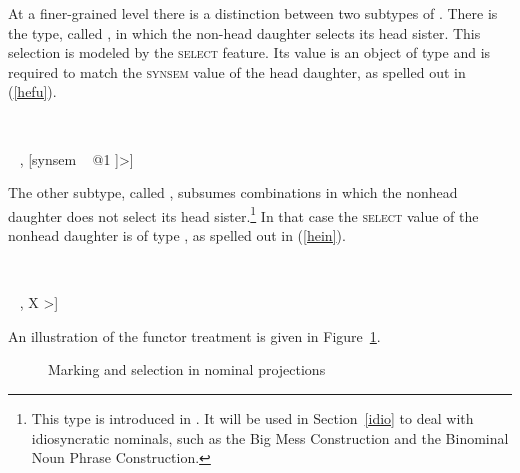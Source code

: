 \documentclass[output=paper
                ,modfonts
                ,nonflat
	        ,collection
	        ,collectionchapter
	        ,collectiontoclongg
 	        ,biblatex
                ,babelshorthands
                ,newtxmath
                ,draftmode
                ,colorlinks, citecolor=brown
]{./langsci/langscibook}
\begin{document}
\noindent
At a finer-grained level there is a distinction between two subtypes of 
. There is the type, called ,  
in which the non-head daughter selects its head sister. This selection is modeled 
by the \textsc{select} feature. Its value is an object of type  and is 
required to match the \textsc{synsem} value of the head daughter, as spelled out 
in (\ref{hefu}).  

\begin{exe}
\ex\label{hefu} 
 ~ \impl ~ 
\begin{avm}
[dtrs ~ <[synsem|loc|category|head|select ~ @1] ~ , [synsem ~ @1 ]>] 
\end{avm}
\end{exe} 

\noindent
The other subtype, called , subsumes combinations in 
which the nonhead daughter does not select its head sister.\footnote{This type is 
introduced in \citet[130]{VanEynde98a}. It will be used in Section~\ref{idio} to deal with 
idiosyncratic nominals, such as the Big Mess Construction and the Binominal Noun Phrase 
Construction.} In that case the \textsc{select} value of the nonhead daughter is of type 
, as spelled out in (\ref{hein}). 

\begin{exe}
\ex\label{hein} 
 ~ \impl ~\\
\begin{avm}
[dtrs ~ <[synsem|loc|category|head|select ~ \type{none}] ~ , X >]
\end{avm}
\end{exe}    

An illustration of the functor treatment is given in Figure~\ref{markyy}.

\begin{figure}
\centering
{}
\caption{\label{markyy} Marking and selection in nominal projections}
\end{figure}
\end{document}
